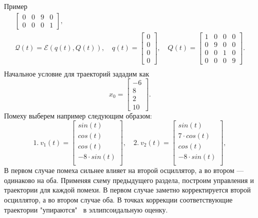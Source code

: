 \begin{section}{Пример}
\begin{gather*}
\begin{bmatrix}
        0 & 0 & 9 & 0 \\[0.3em]
        0 & 0 & 0 & 1
    \end{bmatrix}, \\
    \mathcal{Q}(t) = \mathcal{E}(q(t), Q(t)), \quad
    q(t) = \begin{bmatrix}
        0 \\[0.3em]
        0 \\[0.3em]
        0 \\[0.3em]
        0
    \end{bmatrix}, \quad
    Q(t) = \begin{bmatrix}
        1 & 0 & 0 & 0 \\[0.3em]
        0 & 9 & 0 & 0 \\[0.3em]
        0 & 0 & 1 & 0 \\[0.3em]
        0 & 0 & 0 & 9
    \end{bmatrix}. \\
\end{gather*}
Начальное условие для траекторий зададим как
\begin{equation*}
    x_0 = \begin{bmatrix}
        -6 \\[0.3em]
        8 \\[0.3em]
        2 \\[0.3em]
        10
    \end{bmatrix}.
\end{equation*}
Помеху выберем например следующим образом:
\begin{equation*}
    1. \
    v_1(t) = \begin{bmatrix}
        sin(t) \\[0.3em]
        cos(t) \\[0.3em]
        cos(t) \\[0.3em]
        -8 \cdot sin(t) \\[0.3em]
    \end{bmatrix}, \quad 
    2. \
    v_2(t) = \begin{bmatrix}
        sin(t) \\[0.3em]
        7 \cdot cos(t) \\[0.3em]
        cos(t) \\[0.3em]
        -8 \cdot sin(t) \\[0.3em]
    \end{bmatrix},
\end{equation*}
В первом случае помеха сильнее влияет на второй осциллятор, а во втором --- одинаково на оба.
Применяя схему предыдущего раздела, построим управления и траектории для каждой помехи.
В первом случае заметно корректируется второй осциллятор, а во втором случае оба. В точках коррекции
соответствующие траектории "упираются" \ в эллипсоидальную оценку.


\end{section}
